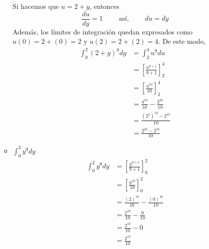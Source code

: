 \documentclass[12pt]{exam}
\begin{document}
\begin{questions}
\begin{enumerate}[a)]
\begin{multicols}{2}
\begin{itemize}[format=\textbf]
        Si hacemos que $u=2+y$, entonces
        $$ \frac{du}{dy}=1 \qquad \text{ así, } \qquad du=dy $$
        Además, los límites de integración quedan expresados como $u(0)=2+(0)=2$ y $u(2)=2+(2)=4$. De este modo,
        \begin{align*}
          \int_0^2(2+y)^9dy
          &= \int_{2}^{4} u^9 du  \\
          &= \left[\frac{u^{9+1}}{9+1}\right]_{2}^{4}\\
          &= \left[\frac{u^{10}}{10}\right]_{2}^{4}\\
          &= \frac{4^{10}}{10} - \frac{2^{10}}{10} \\
          &= \frac{(2^2)^{10}-2^{10}}{10}\\
          &= \frac{2^{20}-2^{10}}{10}
        \end{align*}
      \item $\int_0^2y^9dy$
        \begin{align*}
          \int_0^2y^9dy
          &= \left[\frac{y^{9+1}}{9+1}\right]_0^2\\
          &= \left[\frac{y^{10}}{10}\right]_0^2\\
          &= \frac{(2)^{10}}{10} - \frac{(0)^{10}}{10} \\
          &= \frac{2^{10}}{10} - \frac{0}{10}\\
          &= \frac{2^{10}}{10} - 0\\
          &= \frac{2^{10}}{10}
        \end{align*}
      \end{itemize}
    \end{multicols}
    

\end{enumerate}
\end{questions}
\end{document}
